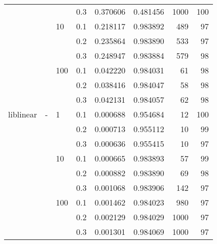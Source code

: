 \begin{table}[H]
\begin{tabular}{llllrrrr}
          &   &     & 0.3 &  0.370606 &  0.481456 &    1000 &   100 \\
          &   & 10  & 0.1 &  0.218117 &  0.983892 &     489 &    97 \\
          &   &     & 0.2 &  0.235864 &  0.983890 &     533 &    97 \\
          &   &     & 0.3 &  0.248947 &  0.983884 &     579 &    98 \\
          &   & 100 & 0.1 &  0.042220 &  0.984031 &      61 &    98 \\
          &   &     & 0.2 &  0.038416 &  0.984047 &      58 &    98 \\
          &   &     & 0.3 &  0.042131 &  0.984057 &      62 &    98 \\
liblinear & - & 1   & 0.1 &  0.000688 &  0.954684 &      12 &   100 \\
          &   &     & 0.2 &  0.000713 &  0.955112 &      10 &    99 \\
          &   &     & 0.3 &  0.000636 &  0.955415 &      10 &    97 \\
          &   & 10  & 0.1 &  0.000665 &  0.983893 &      57 &    99 \\
          &   &     & 0.2 &  0.000882 &  0.983890 &      69 &    98 \\
          &   &     & 0.3 &  0.001068 &  0.983906 &     142 &    97 \\
          &   & 100 & 0.1 &  0.001462 &  0.984023 &     980 &    97 \\
          &   &     & 0.2 &  0.002129 &  0.984029 &    1000 &    97 \\
          &   &     & 0.3 &  0.001301 &  0.984069 &    1000 &    97 \\
\bottomrule
\end{tabular}
\end{table}
